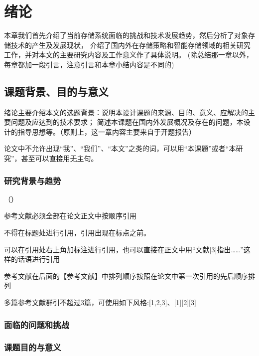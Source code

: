 \section{绪\hspace{1em}论}
本章我们首先介绍了当前存储系统面临的挑战和技术发展趋势，然后分析了对象存储技术的产生及发展现状，
介绍了国内外在存储策略和智能存储领域的相关研究工作，并对本文的主要研究内容及工作意义作了具体说明。
(除总结那一章以外，每章都加一段引言，注意引言和本章小结内容是不同的)

\subsection{课题背景、目的与意义}
绪论主要介绍本文的选题背景：说明本设计课题的来源、目的、意义、应解决的主要问题及应达到的技术要求；
简述本课题在国内外发展概况及存在的问题，本设计的指导思想等。（原则上，这一章内容主要来自于开题报告）

论文中不允许出现“我”、“我们”、“本文”之类的词，可以用“本课题”或者“本研究”，甚至可以直接用无主句。

\subsubsection{研究背景与趋势}
\begin{list}{（）}{
  \setlength{\leftmargin}{0pt}
  \settowidth{\labelwidth}{（1）}
  \setlength{\labelsep}{0pt}
  \setlength{\itemindent}{\dimexpr\parindent+\labelwidth\relax}
  \setlength{\itemsep}{\parskip}
  \setlength{\parsep}{0pt}
  \setlength{\topsep}{0pt}
  \setlength{\partopsep}{0pt}
}
\setlength{\parindent}{\originalparindent}
    \item 参考文献必须全部在论文正文中按顺序引用
    \item 不得在标题处进行引用，引用出现在标点之前。
    \item 可以在引用处右上角加标注进行引用，也可以直接在正文中用“文献[3]指出……”这样的话语进行引用
    \item 参考文献在后面的【参考文献】中排列顺序按照在论文中第一次引用的先后顺序排列
    \item 多篇参考文献群引不超过3篇，可使用如下风格:[1,2,3]、[1][2][3]
\end{list}

\subsubsection{面临的问题和挑战}

\subsubsection{课题目的与意义}

